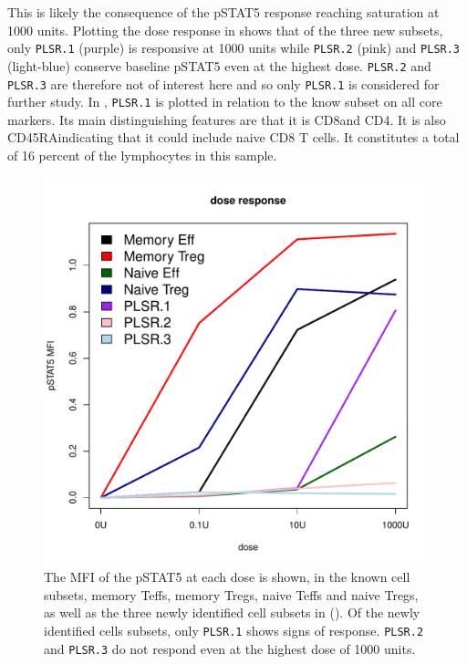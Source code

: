 This is likely the consequence of the pSTAT5 response reaching saturation at 1000 units.
Plotting the dose response in  shows that of the three new subsets, only \texttt{PLSR.1} (purple) is responsive at 1000 units while \texttt{PLSR.2} (pink) and \texttt{PLSR.3} (light-blue) conserve baseline pSTAT5 even at the highest dose.
\texttt{PLSR.2} and \texttt{PLSR.3} are therefore not of interest here and so only \texttt{PLSR.1} is considered for further study.
In , \texttt{PLSR.1} is plotted in relation to the know subset on all core markers.
Its main distinguishing features are that it is CD8\positive and CD4\negative.
It is also CD45RA\positive indicating that it could include naive CD8 T cells.
It constitutes a total of 16 percent of the lymphocytes in this sample.
\begin{figure}
\centering
\includegraphics[scale=.4]{figures/plsr-lymphocytes-dose-response}
{
The MFI of the pSTAT5 at each dose is shown, in the known cell subsets, memory Teffs, memory Tregs, naive Teffs and naive Tregs, as well as the three newly identified cell subsets in ().
Of the newly identified cells subsets, only \texttt{PLSR.1} shows signs of response.
\texttt{PLSR.2} and \texttt{PLSR.3} do not respond even at the highest dose of 1000 units.
}
\end{figure}

